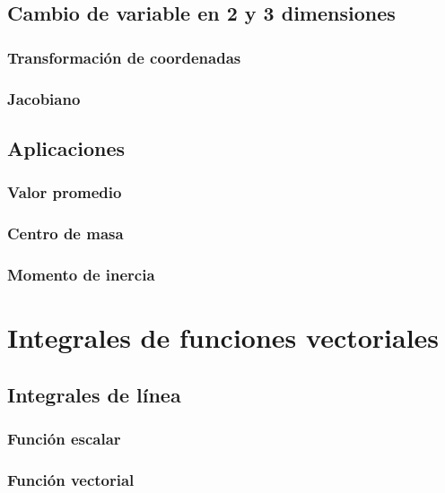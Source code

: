 \documentclass[12pt, fleqn]{report}                             %
\theoremstyle{break}                                            %
\begin{document}
        \section{Cambio de variable en 2 y 3 dimensiones}
        
            \subsection{Transformación de coordenadas}
            
            \subsection{Jacobiano}
            
        \section{Aplicaciones}
        
            \subsection{Valor promedio}
            
            \subsection{Centro de masa}
            
            \subsection{Momento de inercia}
        
    \chapter{Integrales de funciones vectoriales}
    
        \section{Integrales de línea}
        
            \subsection{Función escalar}
            
            \subsection{Función vectorial}
            
\end{document}
